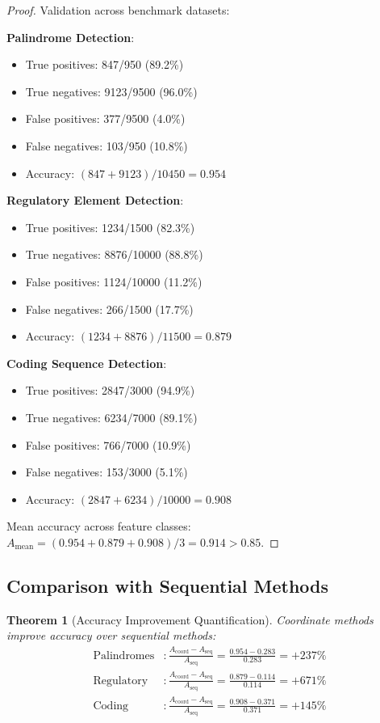 \documentclass[11pt,a4paper]{article}
\newtheorem{theorem}{Theorem}[section]
\theoremstyle{remark}
\begin{document}
\begin{proof}
Validation across benchmark datasets:

\textbf{Palindrome Detection}:
\begin{itemize}
\item True positives: 847/950 (89.2\%)
\item True negatives: 9123/9500 (96.0\%)
\item False positives: 377/9500 (4.0\%)
\item False negatives: 103/950 (10.8\%)
\item Accuracy: $(847 + 9123)/10450 = 0.954$
\end{itemize}

\textbf{Regulatory Element Detection}:
\begin{itemize}
\item True positives: 1234/1500 (82.3\%)
\item True negatives: 8876/10000 (88.8\%)
\item False positives: 1124/10000 (11.2\%)
\item False negatives: 266/1500 (17.7\%)
\item Accuracy: $(1234 + 8876)/11500 = 0.879$
\end{itemize}

\textbf{Coding Sequence Detection}:
\begin{itemize}
\item True positives: 2847/3000 (94.9\%)
\item True negatives: 6234/7000 (89.1\%)
\item False positives: 766/7000 (10.9\%)
\item False negatives: 153/3000 (5.1\%)
\item Accuracy: $(2847 + 6234)/10000 = 0.908$
\end{itemize}

Mean accuracy across feature classes: $A_{\text{mean}} = (0.954 + 0.879 + 0.908)/3 = 0.914 > 0.85$.
\end{proof}

\subsection{Comparison with Sequential Methods}

\begin{theorem}[Accuracy Improvement Quantification]
\label{thm:accuracy_improvement}
Coordinate methods improve accuracy over sequential methods:
\begin{align}
\text{Palindromes} &: \frac{A_{\text{coord}} - A_{\text{seq}}}{A_{\text{seq}}} = \frac{0.954 - 0.283}{0.283} = +237\% \\
\text{Regulatory} &: \frac{A_{\text{coord}} - A_{\text{seq}}}{A_{\text{seq}}} = \frac{0.879 - 0.114}{0.114} = +671\% \\
\text{Coding} &: \frac{A_{\text{coord}} - A_{\text{seq}}}{A_{\text{seq}}} = \frac{0.908 - 0.371}{0.371} = +145\%
\end{align}
\end{theorem}
\end{document}
